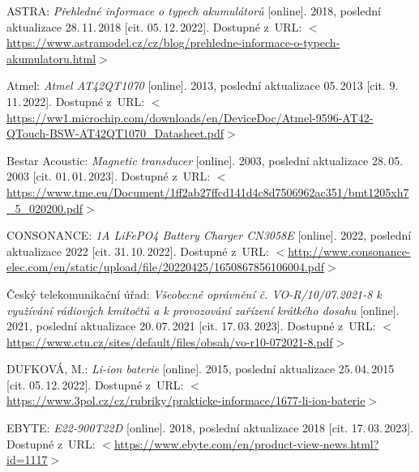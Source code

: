 \begin{thebibliography}{99}

    ASTRA:
    \emph{Přehledné informace o typech akumulátorů}\/ [online].
    2018, poslední aktualizace 28.\,11.\,2018 [cit. 05.\,12.\,2022].
    Dostupné z~URL:
    \(<\)\url{https://www.astramodel.cz/cz/blog/prehledne-informace-o-typech-akumulatoru.html}\(>\)

    Atmel:
    \emph{Atmel AT42QT1070}\/ [online].
    2013, poslední aktualizace 05.\,2013 [cit. 9.\,11.\,2022].
    Dostupné z~URL: 
    \(<\)\url{https://ww1.microchip.com/downloads/en/DeviceDoc/Atmel-9596-AT42-QTouch-BSW-AT42QT1070_Datasheet.pdf}\(>\)

    Bestar Acoustic:
    \emph{Magnetic transducer}\/ [online].
    2003, poslední aktualizace 28.\,05.\,2003 [cit. 01.\,01.\,2023]. 
    Dostupné z~URL:
    \(<\)\url{https://www.tme.eu/Document/1ff2ab27ffcd141d4c8d7506962ac351/bmt1205xh7_5_020200.pdf}\(>\)

    CONSONANCE:
    \emph{1A LiFePO4 Battery Charger CN3058E}\/ [online].
    2022, poslední aktualizace 2022 [cit. 31.\,10.\,2022].
    Dostupné z~URL: %
    \(<\)\url{http://www.consonance-elec.com/en/static/upload/file/20220425/1650867856106004.pdf}\(>\)

    Český telekomunikační úřad:
    \emph{Všeobecné oprávnění č. VO-R/10/07.2021-8 k využívání rádiových kmitočtů a k provozování zařízení krátkého dosahu}\/ [online].
    2021, poslední aktualizace 20.\,07.\,2021 [cit. 17.\,03.\,2023].
    Dostupné z~URL:
    \(<\)\url{https://www.ctu.cz/sites/default/files/obsah/vo-r10-072021-8.pdf}\(>\)

    DUFKOVÁ, M.:
    \emph{Li-ion baterie}\/ [online].
    2015, poslední aktualizace 25.\,04.\,2015 [cit. 05.\,12.\,2022].
    Dostupné z~URL:
    \(<\)\url{https://www.3pol.cz/cz/rubriky/prakticke-informace/1677-li-ion-baterie}\(>\)

    EBYTE:
    \emph{E22-900T22D}\/ [online].
    2018, poslední aktualizace 2018 [cit. 17.\,03.\,2023].
    Dostupné z~URL:
    \(<\)\url{https://www.ebyte.com/en/product-view-news.html?id=1117}\(>\)


\end{thebibliography}
